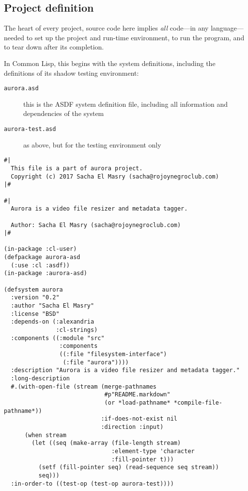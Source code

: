 \documentclass{article}
\begin{document}
\subsection{Project definition}
\label{sec:org0380305}

The heart of every project, source code here implies \emph{all} code---in any
language---needed to set up the project and run-time environment, to run the
program, and to tear down after its completion.

In Common Lisp, this begins with the system definitions, including the
definitions of its shadow testing environment:

\begin{description}
\item[{\texttt{aurora.asd}}] this is the ASDF system definition file, including all
information and dependencies of the system
\item[{\texttt{aurora-test.asd}}] as above, but for the testing environment only
\end{description}

\begin{verbatim}
#|
  This file is a part of aurora project.
  Copyright (c) 2017 Sacha El Masry (sacha@rojoynegroclub.com)
|#

#|
  Aurora is a video file resizer and metadata tagger.

  Author: Sacha El Masry (sacha@rojoynegroclub.com)
|#

(in-package :cl-user)
(defpackage aurora-asd
  (:use :cl :asdf))
(in-package :aurora-asd)

(defsystem aurora
  :version "0.2"
  :author "Sacha El Masry"
  :license "BSD"
  :depends-on (:alexandria
               :cl-strings)
  :components ((:module "src"
                :components
                ((:file "filesystem-interface")
                 (:file "aurora"))))
  :description "Aurora is a video file resizer and metadata tagger."
  :long-description
  #.(with-open-file (stream (merge-pathnames
                             #p"README.markdown"
                             (or *load-pathname* *compile-file-pathname*))
                            :if-does-not-exist nil
                            :direction :input)
      (when stream
        (let ((seq (make-array (file-length stream)
                               :element-type 'character
                               :fill-pointer t)))
          (setf (fill-pointer seq) (read-sequence seq stream))
          seq)))
  :in-order-to ((test-op (test-op aurora-test))))
\end{verbatim}
\end{document}

